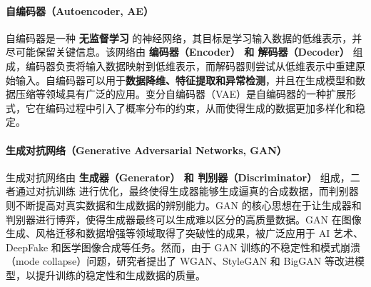 \paragraph*{ 自编码器（Autoencoder, AE）}
自编码器是一种 {\bf 无监督学习} 的神经网络，其目标是学习输入数据的低维表示，并尽可能保留关键信息。该网络由 {\bf 编码器（Encoder） 和 解码器（Decoder）} 组成，编码器负责将输入数据映射到低维表示，而解码器则尝试从低维表示中重建原始输入。自编码器可以用于{\bf  数据降维、特征提取和异常检测}，并且在生成模型和数据压缩等领域具有广泛的应用。变分自编码器（VAE）是自编码器的一种扩展形式，它在编码过程中引入了概率分布的约束，从而使得生成的数据更加多样化和稳定。
\paragraph*{生成对抗网络（Generative Adversarial Networks, GAN）  }
生成对抗网络由 {\bf 生成器（Generator） 和 判别器（Discriminator） }组成，二者通过对抗训练 进行优化，最终使得生成器能够生成逼真的合成数据，而判别器则不断提高对真实数据和生成数据的辨别能力。GAN 的核心思想在于让生成器和判别器进行博弈，使得生成器最终可以生成难以区分的高质量数据。GAN 在图像生成、风格迁移和数据增强等领域取得了突破性的成果，被广泛应用于 AI 艺术、DeepFake 和医学图像合成等任务。然而，由于 GAN 训练的不稳定性和模式崩溃（mode collapse）问题，研究者提出了 WGAN、StyleGAN 和 BigGAN 等改进模型，以提升训练的稳定性和生成数据的质量。
